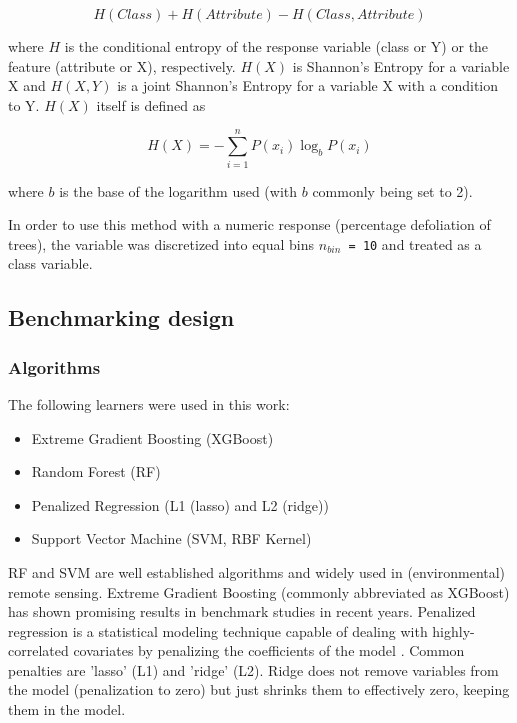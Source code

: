 \documentclass[remotesensing,article,submit,moreauthors,pdftex]{Definitions/mdpi}
\begin{document}
\begin{equation}
	H(Class) + H(Attribute) - H(Class, Attribute)
\end{equation}

where \(H\) is the conditional entropy of the response variable (class or Y) or the feature (attribute or X), respectively.
$H(X)$ is Shannon's Entropy \cite{shannon1948} for a variable X and $H(X, Y)$ is a joint Shannon's Entropy for a variable X with a condition to Y.
$H(X)$ itself is defined as

\begin{equation}
	H(X) = - \sum_{i=1}^{n} P(x_i)\log_bP(x_i)
\end{equation}

where $b$ is the base of the logarithm used (with $b$ commonly being set to 2).

In order to use this method with a numeric response (percentage defoliation of trees), the variable was discretized into equal bins \texttt{\(n_{bin}\) = 10} and treated as a class variable.

\subsection{Benchmarking design}

\subsubsection{Algorithms}

The following learners were used in this work:

\begin{itemize}
	\item  Extreme Gradient Boosting (XGBoost)
	\item  Random Forest (RF)
	\item  Penalized Regression (L1 (lasso) and L2 (ridge))
	\item  Support Vector Machine (SVM, RBF Kernel)
\end{itemize}

RF and SVM are well established algorithms and widely used in (environmental) remote sensing.
Extreme Gradient Boosting (commonly abbreviated as XGBoost) has shown promising results in benchmark studies in recent years.
Penalized regression is a statistical modeling technique capable of dealing with highly-correlated covariates by penalizing the coefficients of the model \cite{hastie2001}.
Common penalties are 'lasso' (L1) and 'ridge' (L2).
Ridge does not remove variables from the model (penalization to zero) but just shrinks them to effectively zero, keeping them in the model.
\end{document}
